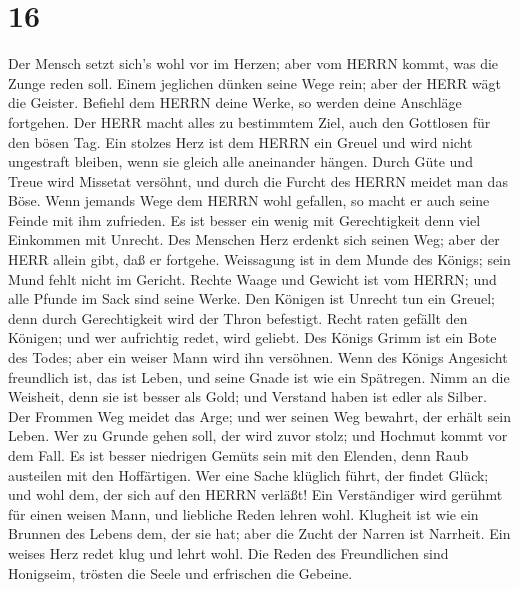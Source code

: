 \hypertarget{section-15}{%
\section{16}\label{section-15}}

 Der Mensch setzt sich's wohl vor im Herzen; aber vom HERRN
kommt, was die Zunge reden soll.  Einem jeglichen dünken
seine Wege rein; aber der HERR wägt die Geister.  Befiehl
dem HERRN deine Werke, so werden deine Anschläge fortgehen. 
Der HERR macht alles zu bestimmtem Ziel, auch den Gottlosen für den
bösen Tag.  Ein stolzes Herz ist dem HERRN ein Greuel und
wird nicht ungestraft bleiben, wenn sie gleich alle aneinander hängen.
 Durch Güte und Treue wird Missetat versöhnt, und durch die
Furcht des HERRN meidet man das Böse.  Wenn jemands Wege dem
HERRN wohl gefallen, so macht er auch seine Feinde mit ihm zufrieden.
 Es ist besser ein wenig mit Gerechtigkeit denn viel
Einkommen mit Unrecht.  Des Menschen Herz erdenkt sich
seinen Weg; aber der HERR allein gibt, daß er fortgehe. 
Weissagung ist in dem Munde des Königs; sein Mund fehlt nicht im
Gericht.  Rechte Waage und Gewicht ist vom HERRN; und alle
Pfunde im Sack sind seine Werke.  Den Königen ist Unrecht
tun ein Greuel; denn durch Gerechtigkeit wird der Thron befestigt.
 Recht raten gefällt den Königen; und wer aufrichtig redet,
wird geliebt.  Des Königs Grimm ist ein Bote des Todes;
aber ein weiser Mann wird ihn versöhnen.  Wenn des Königs
Angesicht freundlich ist, das ist Leben, und seine Gnade ist wie ein
Spätregen.  Nimm an die Weisheit, denn sie ist besser als
Gold; und Verstand haben ist edler als Silber.  Der Frommen
Weg meidet das Arge; und wer seinen Weg bewahrt, der erhält sein Leben.
 Wer zu Grunde gehen soll, der wird zuvor stolz; und
Hochmut kommt vor dem Fall.  Es ist besser niedrigen Gemüts
sein mit den Elenden, denn Raub austeilen mit den Hoffärtigen.
 Wer eine Sache klüglich führt, der findet Glück; und wohl
dem, der sich auf den HERRN verläßt!  Ein Verständiger wird
gerühmt für einen weisen Mann, und liebliche Reden lehren wohl.
 Klugheit ist wie ein Brunnen des Lebens dem, der sie hat;
aber die Zucht der Narren ist Narrheit.  Ein weises Herz
redet klug und lehrt wohl.  Die Reden des Freundlichen sind
Honigseim, trösten die Seele und erfrischen die Gebeine. 
